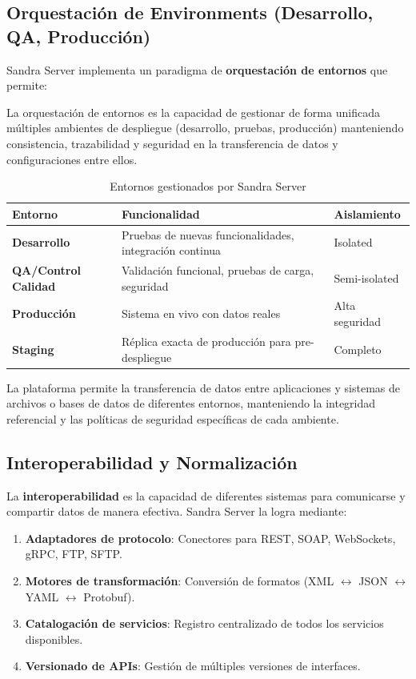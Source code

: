 \subsection{Orquestación de Environments (Desarrollo, QA, Producción)}

Sandra Server implementa un paradigma de \textbf{orquestación de entornos} que permite:

\begin{definicion}
La orquestación de entornos es la capacidad de gestionar de forma unificada múltiples ambientes de despliegue (desarrollo, pruebas, producción) manteniendo consistencia, trazabilidad y seguridad en la transferencia de datos y configuraciones entre ellos.
\end{definicion}

\begin{table}[H]
\centering
\caption{Entornos gestionados por Sandra Server}
\begin{tabular}{|l|p{8cm}|p{3cm}|}
\hline
\textbf{Entorno} & \textbf{Funcionalidad} & \textbf{Aislamiento} \\ \hline
\textbf{Desarrollo} & Pruebas de nuevas funcionalidades, integración continua & Isolated \\ \hline
\textbf{QA/Control Calidad} & Validación funcional, pruebas de carga, seguridad & Semi-isolated \\ \hline
\textbf{Producción} & Sistema en vivo con datos reales & Alta seguridad \\ \hline
\textbf{Staging} & Réplica exacta de producción para pre-despliegue & Completo \\ \hline
\end{tabular}
\end{table}

La plataforma permite la transferencia de datos entre aplicaciones y sistemas de archivos o bases de datos de diferentes entornos, manteniendo la integridad referencial y las políticas de seguridad específicas de cada ambiente.

\subsection{Interoperabilidad y Normalización}

La \textbf{interoperabilidad} es la capacidad de diferentes sistemas para comunicarse y compartir datos de manera efectiva. Sandra Server la logra mediante:

\begin{enumerate}
\item \textbf{Adaptadores de protocolo}: Conectores para REST, SOAP, WebSockets, gRPC, FTP, SFTP.
\item \textbf{Motores de transformación}: Conversión de formatos (XML $\leftrightarrow$ JSON $\leftrightarrow$ YAML $\leftrightarrow$ Protobuf).
\item \textbf{Catalogación de servicios}: Registro centralizado de todos los servicios disponibles.
\item \textbf{Versionado de APIs}: Gestión de múltiples versiones de interfaces.
\end{enumerate}

